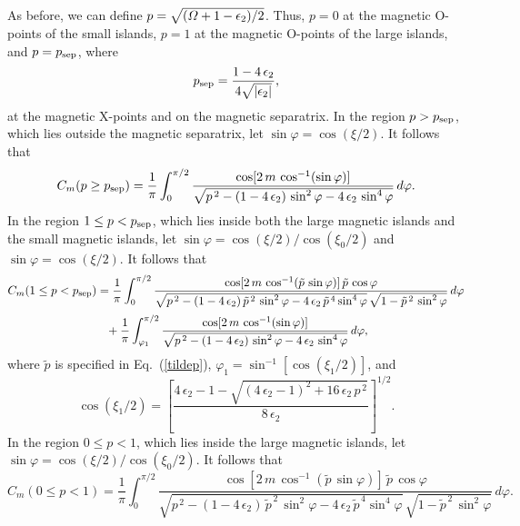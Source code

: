 \documentclass[12pt,prb,aps]{revtex4-1}
\begin{document}
As before, we can define $p=\sqrt{({\mit\Omega}+1-\epsilon_2)/2}$.  Thus, $p=0$ at the magnetic O-points of the small islands,  $p=1$ at the magnetic O-points of the large islands, and $p=p_{\rm sep}$, where
\begin{equation}
p_{\rm sep} = \frac{1-4\,\epsilon_2}{4\sqrt{|\epsilon_2|}},
\end{equation}
at the magnetic X-points and on the magnetic separatrix. In the region $p>p_{\rm sep}$, which lies outside the  magnetic separatrix, let 
$\sin\varphi = \cos(\xi/2)$. 
It follows that 
\begin{equation}
 C_m(p\geq p_{\rm sep})=\frac{1}{\pi} \int_{0}^{\pi/2}\frac{\cos[2\,m\,\cos^{-1}(\sin\varphi)]}
 {\sqrt{p^{\,2}-(1-4\,\epsilon_2)\,\sin^2\varphi-4\,\epsilon_2\,\sin^4\varphi}}\,d\varphi.
\end{equation}
In the region $1\leq p< p_{\rm sep}$, which lies inside both the large magnetic islands and the small magnetic islands, let
$\sin\varphi = \cos(\xi/2)/\cos(\xi_0/2)$ and  $\sin\varphi = \cos(\xi/2)$. 
It follows that 
\begin{align}
 C_m(1\leq p <p_{\rm sep})&=\frac{1}{\pi} \int_{0}^{\pi/2}\frac{\cos[2\,m\,\cos^{-1}(\tilde{p}\,\sin\varphi)]\,\tilde{p}\,\cos\varphi}
 {\sqrt{p^{\,2}-(1-4\,\epsilon_2)\,\tilde{p}^{\,2}\,\sin^2\varphi-4\,\epsilon_2\,\tilde{p}^{\,4}\sin^4\varphi}\,\sqrt{1-\tilde{p}^{\,2}\,\sin^2\varphi}}\,d\varphi\nonumber\\[0.5ex]
 &\phantom{=} +\frac{1}{\pi} \int_{\varphi_1}^{\pi/2}\frac{\cos[2\,m\,\cos^{-1}(\sin\varphi)]}
 {\sqrt{p^{\,2}-(1-4\,\epsilon_2)\,\sin^2\varphi-4\,\epsilon_2\,\sin^4\varphi}}\,d\varphi,
\end{align}
where $\tilde{p}$ is specified in Eq.~(\ref{tildep}), 
$\varphi_1 = \sin^{-1}\left[\cos(\xi_1/2)\right]$,
and
\begin{equation}
\cos(\xi_1/2) = \left[\frac{4\,\epsilon_2-1-\sqrt{(4\,\epsilon_2-1)^2+16\,\epsilon_2\,p^{\,2}}}{8\,\epsilon_2}\right]^{1/2}.
\end{equation}
In the region $0\leq p < 1$, which lies  inside the large  magnetic islands, 
 let 
$\sin\varphi = \cos(\xi/2)/\cos(\xi_0/2)$.
 It follows that 
\begin{equation}
 C_m(0\leq p< 1)=\frac{1}{\pi} \int_{0}^{\pi/2}\frac{\cos[2\,m\,\cos^{-1}(\tilde{p}\,\sin\varphi)]\,\tilde{p}\,\cos\varphi}
 {\sqrt{p^{\,2}-(1-4\,\epsilon_2)\,\tilde{p}^{\,2}\,\sin^2\varphi-4\,\epsilon_2\,\tilde{p}^{\,4}\sin^4\varphi}\,\sqrt{1-\tilde{p}^{\,2}\,\sin^2\varphi}}\,d\varphi.
\end{equation}
\end{document}
